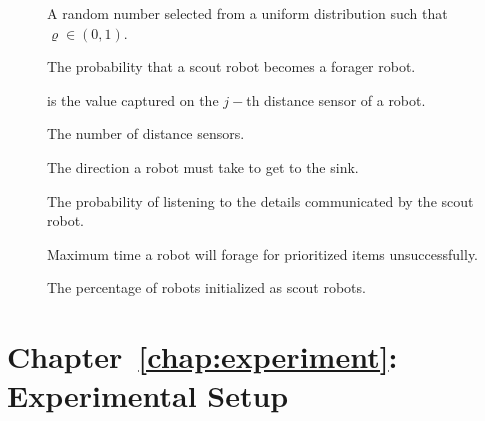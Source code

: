 \begin{description}
	\item[\parbox{\namewidth}{$\varrho$}] A random number selected from a uniform distribution such that $\varrho\in(0,1)$.
	
	\item[\parbox{\namewidth}{$\rho$}] The probability that a scout robot becomes a forager robot.
	
\item[\parbox{\namewidth}{$k_j$}] is the value captured on the $j-$th distance sensor of a robot.

\item[\parbox{\namewidth}{$n$}] The number of distance sensors.

\item[\parbox{\namewidth}{$\sigma$}] The direction a robot must take to get to the sink.

\item[\parbox{\namewidth}{$\alpha$}] The probability of listening to the details communicated by the scout robot.		

\item[\parbox{\namewidth}{$f_{max}$}] Maximum time a robot will forage for prioritized items unsuccessfully.

\item[\parbox{\namewidth}{$X$}] The percentage of robots initialized as scout robots.
\end{description}


\section{Chapter~\ref{chap:experiment}: Experimental Setup}
\label{sec:symbols:foraging}


